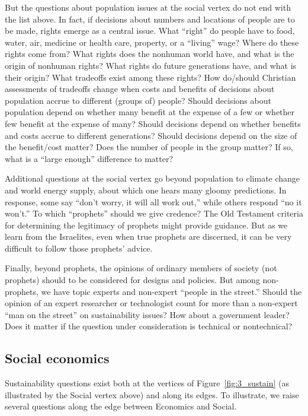 \documentclass[12pt]{article}
\begin{document}
But the questions about population issues 
at the social vertex do not end with the list above.
In fact, if decisions about numbers and locations of people are to be made,
rights emerge as a central issue.
What ``right'' do people have to food, water, air, medicine or health care, property, or a ``living'' wage? 
Where do these rights come from? 
What rights does the nonhuman world have, and what is the origin of nonhuman rights?
What rights do future generations have, and what is their origin?
What tradeoffs exist among these rights?
How do/should Christian assessments of tradeoffs change when costs and benefits
of decisions about population accrue to different (groups of) people?
Should decisions about population depend on whether many benefit at the expense of a few or
whether few benefit at the expense of many? 
Should decisions depend on whether benefits and costs accrue to different generations? 
Should decisions depend on the size of the benefit/cost matter? 
Does the number of people in the group matter? 
If so, what is a ``large enough'' difference to matter?

Additional questions at the social vertex go beyond population
to climate change and world energy supply, 
about which one hears many gloomy predictions.
In response, some say ``don't worry, it will all work out,'' while
others respond ``no it won't.'' 
To which ``prophets'' should we give credence?  
The Old Testament criteria for determining the legitimacy of prophets might provide guidance.
But as we learn from the Israelites, even when true prophets are discerned,
it can be very difficult to follow those prophets' advice. 

Finally, beyond prophets, the opinions of ordinary members of society (not prophets) 
should to be considered for designs and policies. 
But among non-prophets, we have topic experts and non-expert ``people in the street.''
Should the opinion of an expert researcher or technologist count for more 
than a non-expert ``man on the street'' on sustainability issues?
How about a government leader? 
Does it matter if the question under consideration is technical or nontechnical?


\subsection{Social economics}
\label{sec:social_economics}

Sustainability questions exist both at the vertices of Figure~\ref{fig:3_sustain}
(as illustrated by the Social vertex above) 
and along its edges.
To illustrate, we raise several questions along the edge between Economics and Social.
\end{document}
